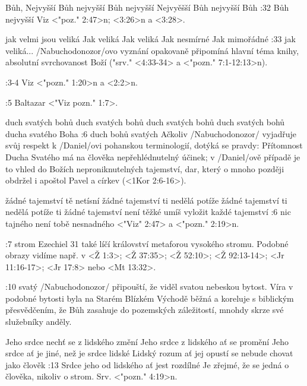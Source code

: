     {Bůh, Nejvyšší}   %
    {Bůh nejvyšší}   %
    {Bůh nejvyšší}   %
    {Nejvyěšší Bůh}   %
    {nejvyšší Bůh}   %
:32 {Bůh nejvyšší} Viz <"poz." 2:47>n;  <3:26>n a <3:28>.

    {jak velmi jsou veliká}   %
    {Jak veliká}   %
    {Jak veliká}   %
    {Jak nesmírné}   %
    {Jak mimořádné}   %
:33 {jak veliká}...  \x/Nabuchodonozor/ovo vyznání opakovaně připomíná hlavní téma knihy, absolutní svrchovanost Boží ("srv." <4:33-34> a <"pozn." 7:1-12:13>n).

:3-4 {} Viz <"pozn." 1:20>n a <2:2>n.

:5 {Baltazar} <"Viz pozn." 1:7>.

    {duch svatých bohů}   %
    {duch svatých bohů}   %
    {duch svatých bohů}   %
    {duch svatých bohů}   %
    {ducha svatého Boha}   %
:6 {duch bohů svatých} Ačkoliv \x/Nabuchodonozor/ vyjadřuje svůj respekt k \x/Daniel/ovi pohanskou terminologií, dotýká se pravdy: Přítomnost Ducha Svatého má na člověka nepřehlédnutelný účinek; v \x/Daniel/ově případě je to vhled do Božích neproniknutelných tajemství, dar, který o mnoho později obdržel i apoštol Pavel a církev  (<1Kor 2:6-16>).

    {žádné tajemství tě netísní}   %
    {žádné tajemství ti nedělá potíže}   %
    {žádné tajemství ti nedělá potíže}   %
    {ti žádné tajemství není těžké}   %
    {umíš vyložit každé tajemství}   %
:6 {nic tajného není tobě nesnadného}  <"Viz" 2:47> a <"pozn." 2:19>n.

:7 {strom} Ezechiel 31 také líčí království metaforou vysokého stromu. Podobné obrazy vidíme např. v <Ž 1:3>; <Ž 37:35>; <Ž 52:10>; <Ž 92:13-14>; <Jr 11:16-17>; <Jr 17:8> nebo <Mt 13:32>. 

:10 {svatý}  \x/Nabuchodonozor/ připouští, že viděl svatou nebeskou bytost. Víra v podobné bytosti byla na Starém Blízkém Východě běžná a koreluje s biblickým přesvědčením, že Bůh zasahuje do pozemských záležitostí, mnohdy skrze své služebníky anděly.

    {Jeho srdce nechť se z lidského změní}   %
    {Jeho srdce z lidského ať se promění}   %
    {Jeho srdce ať je jiné, než je srdce lidské}   %
    {Lidský rozum ať jej opustí}   %
    {se nebude chovat jako člověk}   %
:13 {Srdce jeho od lidského ať jest rozdílné}
    Je zřejmé, že se jedná o člověka, nikoliv o strom. Srv. <"pozn." 4:19>n.

